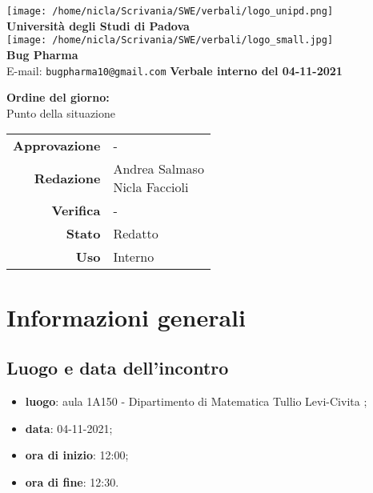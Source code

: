 \documentclass[11pt]{article}
\begin{document}
	\thispagestyle{empty}
	\begin{titlepage}
		\begin{center}
			\texttt{[image: /home/nicla/Scrivania/SWE/verbali/logo\_unipd.png]}\\
			\large \textbf{Università degli Studi di Padova} \\
			\vfill
			\texttt{[image: /home/nicla/Scrivania/SWE/verbali/logo\_small.jpg]}\\
			\large \textbf{Bug Pharma} \\
			\vfill
			\large
			E-mail: 
			\texttt{bugpharma10@gmail.com}
			\vfill
			\Huge \textbf{Verbale interno del 04-11-2021}\\
			
			\large
			
			\vfill
			\textbf{Ordine del giorno:} \\
			Punto della situazione
			
			
			\vfill
			
			
			\begin{tabular}{r|l}
				\textbf{Approvazione} &  -\\
				\textbf{Redazione} &  \parbox[t]{5cm}{Andrea Salmaso \\Nicla Faccioli}\\
				\textbf{Verifica} &  -\\
				\textbf{Stato} & Redatto \\
				\textbf{Uso} & Interno
			\end{tabular}
			\vfill
			
		\end{center}
	\end{titlepage}

	\section{Informazioni generali}
	\subsection{Luogo e data dell'incontro}
	\begin{itemize}
		\item \textbf{luogo}: aula 1A150 - Dipartimento di Matematica Tullio Levi-Civita ;
		\item \textbf{data}: 04-11-2021;
		\item \textbf{ora di inizio}: 12:00;
		\item \textbf{ora di fine}: 12:30.
	\end{itemize}
	
\end{document}

